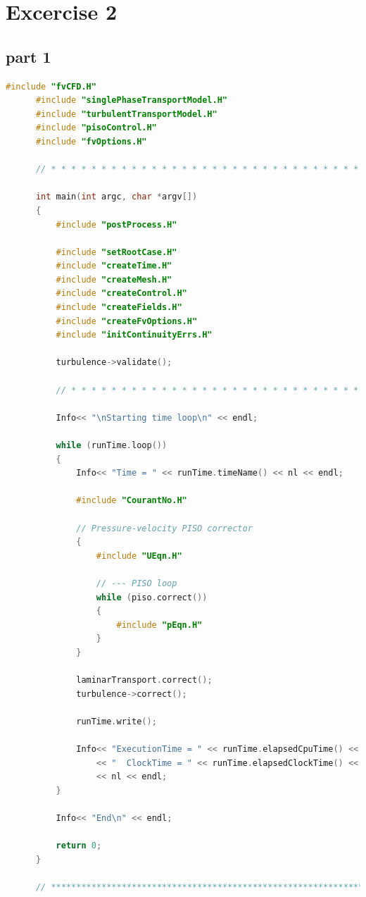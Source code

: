 \documentclass[paper=a4, fontsize=11pt]{article} %
\numberwithin{equation}{section} %
\numberwithin{figure}{section} %
\numberwithin{table}{section} %
\begin{document}
    
    \clearpage
    \section*{Excercise 2}
    \subsection*{part 1}

    \lstset { %
    language=C++,
    basicstyle=\footnotesize,%
    }

    \begin{lstlisting}[language=C++, captionpos = b, caption=Source code for pisoFoam]    
      #include "fvCFD.H"
      #include "singlePhaseTransportModel.H"
      #include "turbulentTransportModel.H"
      #include "pisoControl.H"
      #include "fvOptions.H"
      
      // * * * * * * * * * * * * * * * * * * * * * * * * * * * * * * * * * * * * * //
      
      int main(int argc, char *argv[])
      {
          #include "postProcess.H"
      
          #include "setRootCase.H"
          #include "createTime.H"
          #include "createMesh.H"
          #include "createControl.H"
          #include "createFields.H"
          #include "createFvOptions.H"
          #include "initContinuityErrs.H"
      
          turbulence->validate();
      
          // * * * * * * * * * * * * * * * * * * * * * * * * * * * * * * * * * * * //
      
          Info<< "\nStarting time loop\n" << endl;
      
          while (runTime.loop())
          {
              Info<< "Time = " << runTime.timeName() << nl << endl;
      
              #include "CourantNo.H"
      
              // Pressure-velocity PISO corrector
              {
                  #include "UEqn.H"
      
                  // --- PISO loop
                  while (piso.correct())
                  {
                      #include "pEqn.H"
                  }
              }
      
              laminarTransport.correct();
              turbulence->correct();
      
              runTime.write();
      
              Info<< "ExecutionTime = " << runTime.elapsedCpuTime() << " s"
                  << "  ClockTime = " << runTime.elapsedClockTime() << " s"
                  << nl << endl;
          }
      
          Info<< "End\n" << endl;
      
          return 0;
      }

      // ************************************************************************* //
    \end{lstlisting}
\end{document}
